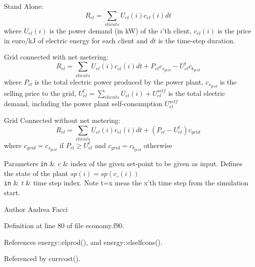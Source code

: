 \begin{DoxyItemize}
\item Stand Alone\-: \[ R_{el} = \sum_{clients} U_{el}(i)c_{el}(i)dt \] where $ U_{el}(i)$ is the power demand (in k\-W) of the $i$'th client, $c_{el}(i)$ is the price in euro/k\-J of electric energy for each client and $ dt$ is the time-\/step duration.\par

\item Grid connected with net metering\-: \[ R_{el} = \sum_{clients} U_{el}(i)c_{el}(i)dt + P_{el}c_{s_{grid}} - U_{el}^{t}c_{b_{grid}} \] where $P_{el}$ is the total electric power produced by the power plant, $c_{s_{grid}}$ is the selling price to the grid, $U_{el}^{t} = \sum_{clients} U_{el}(i) + U_{el}^{self} $ is the total electric demand, including the power plant self-\/consumption $U_{el}^{self}$\par

\item Grid Connected without net metering\-: \[ R_{el} = \sum_{clients} U_{el}(i)c_{el}(i)dt + (P_{el} - U_{el}^{t}) c_{grid} \] where $ c_{grid} = c_{s_{grid}}$ if $P_{el} \ge U_{el}^{t}$ and $ c_{grid} = c_{b_{grid}}$ otherwise 
\begin{DoxyParams}[1]{Parameters}
\mbox{\tt in}  & {\em c} & index of the given set-\/point to be given as input. Defines the state of the plant $sp(i) = sp(c\_(i))$ \\
\hline
\mbox{\tt in}  & {\em t} & time step index. Note t=x meas the x'th time step from the simulation start. \\
\hline
\end{DoxyParams}
\begin{DoxyAuthor}{Author}
Andrea Facci 
\end{DoxyAuthor}

\end{DoxyItemize}

Definition at line 80 of file economy.\-f90.



References energy\-::elprod(), and energy\-::elselfcons().



Referenced by currcost().

